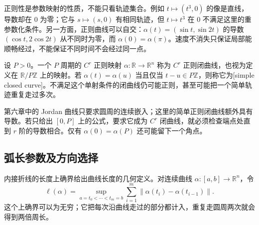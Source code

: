 正则性是参数映射的性质，不能只看轨迹集合。例如 \(t\mapsto(t^3,0)\) 的像是直线，导数却在 \(0\) 为零；它与 \(s\mapsto(s,0)\) 有相同轨迹，但 \(t\mapsto t^3\) 在 \(0\) 不满足这里的重参数化条件。另一方面，正则曲线可以自交：\(\alpha(t)=(\sin t,\sin2t)\) 的导数 \((\cos t,2\cos2t)\) 从不同时为零，而 \(\alpha(0)=\alpha(\pi)\)。速度不消失只保证局部能顺畅经过，不能保证不同时间不会经过同一点。

\begin{definition}\label{g1:def:regular-closed-curve}
	设 \(P>0\)。一个 \(P\) 周期的 \(C^r\) 正则映射 \(\alpha:\mathbb R\to\mathbb R^n\) 称为 \(C^r\) 正则闭曲线，也视为定义在 \(\mathbb R/P\mathbb Z\) 上的映射。若 \(\alpha(t)=\alpha(u)\) 当且仅当 \(t-u\in P\mathbb Z\)，则称它为[simple closed curve]。不满足这个单射条件的闭曲线仍可能正则，甚至可能把一个简单轨迹重复走过多次。
\end{definition}

第六章中的 Jordan 曲线只要求圆周的连续嵌入；这里的简单正则闭曲线额外具有导数。若只给出 \([0,P]\) 上的公式，要求它成为 \(C^r\) 闭曲线，就必须检查端点处直到 \(r\) 阶的导数相合。仅有 \(\alpha(0)=\alpha(P)\) 还可能留下一个角点。

\subsection{弧长参数及方向选择}
\label{g1:subsec:0701:02}

内接折线的长度上确界给出曲线长度的几何定义。对连续曲线 \(\alpha:[a,b]\to\mathbb R^n\)，令
\[
	\ell(\alpha)=\sup_{a=t_0<\cdots<t_m=b}\sum_{i=1}^m\lVert\alpha(t_i)-\alpha(t_{i-1})\rVert.
\]
这个上确界可以为无穷；它把每次沿曲线走过的部分都计入，重复走圆周两次就会得到两倍周长。

